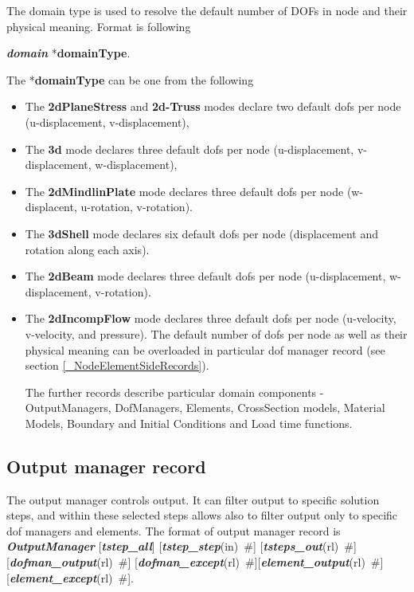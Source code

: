 \documentclass[draft]{article}
\newcommand{\keywordnotype}[1]{\mbox{{\it{\bf{#1}}}}}
\newcommand{\keyword}[2]{\mbox{{\keywordnotype{#1}\tiny (#2)}}}
\newcommand{\entKeyword}[1]{\mbox{{*{\bf{#1}}}}}
\newcommand{\entKeywordInst}[1]{\mbox{{\bf{{#1}}}}}
\newcommand{\field}[2]{\mbox{\keyword{#1}{#2}~\#}}
\newcommand{\optField}[2]{\mbox{[\field{#1}{#2}]}}
\begin{document}
The domain type is used to resolve the
default number of DOFs in node and their physical meaning. Format is following

\keywordnotype{domain} \entKeyword{domainType}.

The \entKeyword{domainType} can be one from the following
\begin{itemize}
\item The \entKeywordInst{2dPlaneStress} and \entKeywordInst{2d-Truss}
modes declare two default dofs per node (u-displacement, v-displacement),
\item The \entKeywordInst{3d} mode declares three default dofs per
node (u-displacement, v-displacement, w-displacement),
\item The \entKeywordInst{2dMindlinPlate} mode declares three default
dofs per node (w-displacent, u-rotation, v-rotation).
\item The \entKeywordInst{3dShell} mode declares six default dofs
per node (displacement and rotation along each axis).
\item The \entKeywordInst{2dBeam} mode declares three default dofs per
node (u-displacement, w-displacement, v-rotation).
\item The \entKeywordInst{2dIncompFlow} mode declares three default
  dofs per node (u-velocity, v-velocity, and pressure).
The default number of dofs per node as well as their physical meaning
can be overloaded in particular dof manager record (see section
\ref{_NodeElementSideRecords}).

The further records describe particular domain components - 
OutputManagers, DofManagers, Elements, CrossSection models, Material
Models, Boundary and Initial Conditions and Load time functions.

\end{itemize}


\subsection{Output manager record}
\label{_OutputManagerRecord}
The output manager controls output. It can filter output to specific
solution steps, and within these selected steps allows also to filter
output only to specific dof managers and elements. The format of
output manager record is \\
\keywordnotype{OutputManager} [\keywordnotype{tstep\_all}]
\optField{tstep\_step}{in} \optField{tsteps\_out}{rl}\newline
[\keywordnotype{dofman\_all}] \optField{dofman\_output}{rl}
\optField{dofman\_except}{rl}\newline
[\keywordnotype{element\_all}] \optField{element\_output}{rl} \optField{element\_except}{rl}.\\
\end{document}
